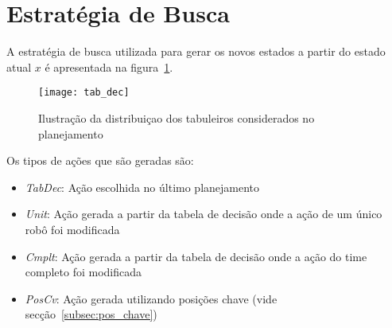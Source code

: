\section{Estratégia de Busca}\label{sec:est_busca}
A estratégia de busca utilizada para gerar os novos
estados a partir do estado atual $x$ é apresentada na
figura~\ref{fig:estr_busca}.

\begin{figure}[H]
  \centering
  \texttt{[image: tab\_dec]}
  \caption{Ilustração da distribuiçao dos tabuleiros
           considerados no planejamento}\label{fig:estr_busca}
\end{figure}

Os tipos de ações que são geradas são:
\begin{itemize}
  \item \textit{TabDec}: Ação escolhida no último planejamento
  \item \textit{Unit}: Ação gerada a partir da tabela de decisão
        onde a ação de um único robô foi modificada
  \item \textit{Cmplt}: Ação gerada a partir da tabela de decisão
        onde a ação do time completo foi modificada
  \item \textit{PosCv}: Ação gerada utilizando posições chave
        (vide secção~\ref{subsec:pos_chave})
\end{itemize}




